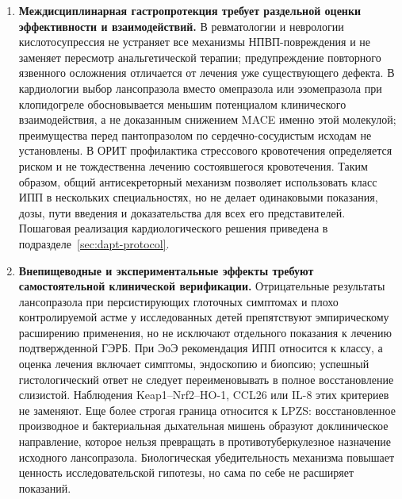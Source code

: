\documentclass[11pt,a4paper,notitlepage]{report}
\newcommand{\src}[1]{\unskip\space\cite{#1}}
\begin{document}
\begin{enumerate}[label=\textbf{\arabic*.},leftmargin=*,itemsep=0.7\baselineskip]
\item \textbf{Междисциплинарная гастропротекция требует раздельной оценки эффективности и взаимодействий.} В ревматологии и неврологии кислотосупрессия не устраняет все механизмы НПВП-повреждения и не заменяет пересмотр анальгетической терапии; предупреждение повторного язвенного осложнения отличается от лечения уже существующего дефекта. В кардиологии выбор лансопразола вместо омепразола или эзомепразола при клопидогреле обосновывается меньшим потенциалом клинического взаимодействия, а не доказанным снижением MACE именно этой молекулой; преимущества перед пантопразолом по сердечно-сосудистым исходам не установлены. В ОРИТ профилактика стрессового кровотечения определяется риском и не тождественна лечению состоявшегося кровотечения. Таким образом, общий антисекреторный механизм позволяет использовать класс ИПП в нескольких специальностях, но не делает одинаковыми показания, дозы, пути введения и доказательства для всех его представителей. Пошаговая реализация кардиологического решения приведена в подразделе~\ref{sec:dapt-protocol}.\src{nice,aspirintrial,sccm,esge2026,cardioplavix2025,sps,cardiocogent2010}

\item \textbf{Внепищеводные и экспериментальные эффекты требуют самостоятельной клинической верификации.} Отрицательные результаты лансопразола при персистирующих глоточных симптомах и плохо контролируемой астме у исследованных детей препятствуют эмпирическому расширению применения, но не исключают отдельного показания к лечению подтвержденной ГЭРБ. При ЭоЭ рекомендация ИПП относится к классу, а оценка лечения включает симптомы, эндоскопию и биопсию; успешный гистологический ответ не следует переименовывать в полное восстановление слизистой. Наблюдения Keap1--Nrf2--HO-1, CCL26 или IL-8 этих критериев не заменяют. Еще более строгая граница относится к LPZS: восстановленное производное и бактериальная дыхательная мишень образуют доклиническое направление, которое нельзя превращать в противотуберкулезное назначение исходного лансопразола. Биологическая убедительность механизма повышает ценность исследовательской гипотезы, но сама по себе не расширяет показаний.\src{toppits,asthma,eoe,eoeguide,eoestat6,molnrf2,molho1,molil8,moltb,moltbstructure}


\end{enumerate}
\end{document}
